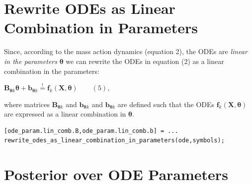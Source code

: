\section{Rewrite ODEs as Linear Combination in Parameters}

\begin{par}
Since, according to the mass action dynamics (equation 2), the ODEs are \textit{linear in the parameters} $\boldsymbol\theta$ we can rewrite the ODEs in equation (2) as a linear combination in the parameters:
\end{par} \vspace{1em}
\begin{par}
$\mathbf{B}_{\boldsymbol{\theta} k} \boldsymbol{\theta} + \mathbf{b}_{\boldsymbol{\theta} k} \stackrel{!}{=}\mathbf{f}_k(\mathbf{X},\boldsymbol{\theta}) \qquad (5)$,
\end{par} \vspace{1em}
\begin{par}
where matrices $\mathbf{B}_{\boldsymbol{\theta} k}$ and $\mathbf{b}_{\boldsymbol{\theta} k}$ and $\mathbf{b}_{\boldsymbol\theta k}$ are defined such that the ODEs $\mathbf{f}_k(\mathbf{X},\boldsymbol{\theta})$ are expressed as a linear combination in $\boldsymbol{\theta}$.
\end{par} \vspace{1em}
\color{RoyalPurple}\begin{verbatim}
[ode_param.lin_comb.B,ode_param.lin_comb.b] = ...
rewrite_odes_as_linear_combination_in_parameters(ode,symbols);
\end{verbatim} 
\color{black}


\section{Posterior over ODE Parameters}


